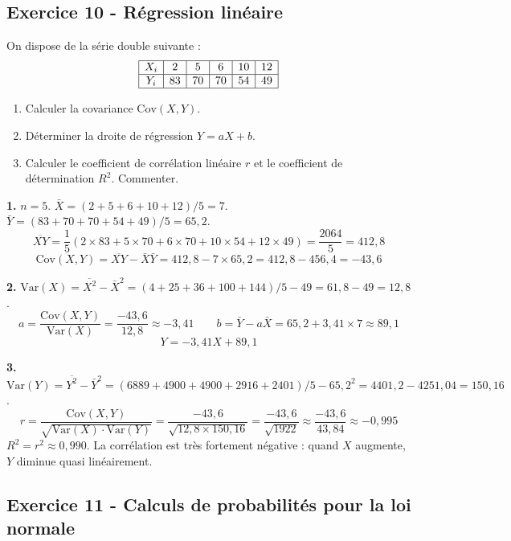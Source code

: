 \documentclass[12pt,a4paper]{article}
\begin{document}
\subsection*{Exercice 10 - Régression linéaire \niveau{\moyen}}

\begin{boiteexercice}
On dispose de la série double suivante :
\[
\begin{array}{|c|c|c|c|c|c|}
\hline
X_i & 2 & 5 & 6 & 10 & 12 \\
\hline
Y_i & 83 & 70 & 70 & 54 & 49 \\
\hline
\end{array}
\]
\begin{enumerate}
  \item Calculer la covariance $\mathrm{Cov}(X,Y)$.
  \item Déterminer la droite de régression $Y = aX + b$.
  \item Calculer le coefficient de corrélation linéaire $r$ et le coefficient de détermination $R^2$. Commenter.
\end{enumerate}
\end{boiteexercice}

\begin{boitecorrige}
\textbf{1.} $n=5$. $\bar{X} = (2+5+6+10+12)/5 = 7$. $\bar{Y} = (83+70+70+54+49)/5 = 65{,}2$.
\[
\overline{XY} = \frac{1}{5}(2\times83+5\times70+6\times70+10\times54+12\times49) = \frac{2064}{5} = 412{,}8
\]
\[
\mathrm{Cov}(X,Y) = \overline{XY} - \bar{X}\bar{Y} = 412{,}8 - 7\times65{,}2 = 412{,}8 - 456{,}4 = \boxed{-43{,}6}
\]

\textbf{2.} $\mathrm{Var}(X) = \overline{X^2} - \bar{X}^2 = (4+25+36+100+144)/5 - 49 = 61{,}8-49 = 12{,}8$.
\[
a = \frac{\mathrm{Cov}(X,Y)}{\mathrm{Var}(X)} = \frac{-43{,}6}{12{,}8} \approx -3{,}41 \qquad b = \bar{Y} - a\bar{X} = 65{,}2 + 3{,}41\times7 \approx 89{,}1
\]
\[
\boxed{Y = -3{,}41X + 89{,}1}
\]

\textbf{3.} $\mathrm{Var}(Y) = \overline{Y^2}-\bar{Y}^2 = (6889+4900+4900+2916+2401)/5 - 65{,}2^2 = 4401{,}2 - 4251{,}04 = 150{,}16$.
\[
r = \frac{\mathrm{Cov}(X,Y)}{\sqrt{\mathrm{Var}(X)\cdot\mathrm{Var}(Y)}} = \frac{-43{,}6}{\sqrt{12{,}8\times150{,}16}} = \frac{-43{,}6}{\sqrt{1922}} \approx \frac{-43{,}6}{43{,}84} \approx \boxed{-0{,}995}
\]
$R^2 = r^2 \approx 0{,}990$. La corrélation est très fortement négative : quand $X$ augmente, $Y$ diminue quasi linéairement.
\end{boitecorrige}

\subsection*{Exercice 11 - Calculs de probabilités pour la loi normale \niveau{\moyen}}
\end{document}
